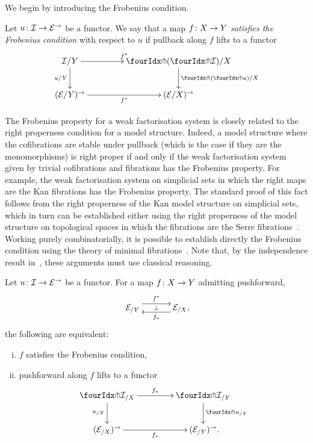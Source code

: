 \documentclass[reqno,10pt,a4paper,oneside,draft]{amsart}
\begin{document}
\medskip

We begin by introducing the Frobenius condition.

\begin{definition}
Let $u \colon \mathcal{I} \to \mathcal{E}^\to$ be a functor.
We say that a map $f \colon X \to Y$ \emph{satisfies the Frobenius condition} with respect to $u$ if pullback along $f$ lifts to a functor
\[
\xymatrix@C=1.5cm{
  \cal{I}/Y
  \ar[r]^{f^*}
  \ar[d]_{u/Y}
&
  \liftl{ ( \liftr{\cal{I}} )}/X  
  \ar[d]^{\liftl{(\liftr{u})/X}}
\\
  (\catE/Y)^\to \ar[r]_{f^*}
&
  (\catE/X)^\to
}
\]
\end{definition}


The Frobenius property for a weak factorisation system is closely related to the right properness condition for a model structure.
Indeed, a model structure where the cofibrations are stable under pullback (which is the case if they are the monomorphisms) is right proper if and only if the weak factorisation system given by trivial cofibrations and fibrations has the Frobenius property.
For example, the weak factorisation system on simplicial sets in which the right maps are the Kan fibrations has the Frobenius property.
The standard proof of this fact follows from the right properness of the Kan model structure on simplicial sets, which in turn can be established either using the right properness of the model structure on topological spaces in which  the fibrations are the Serre fibrations~\cite[Theorem~13.1.13]{hirschhorn-model-localizations}. Working purely combinatorially, it is possible to
establish directly the Frobenius condition using the theory of minimal fibrations~\cite[Theorem~1.7.1]{joyal-tierney-notes}.
Note that, by the independence result in~\cite{coquand-non-constructivity-kan}, these arguments must use classical reasoning. 


\begin{proposition} \label{lift-dependent-product}
Let $u \colon \mathcal{I} \to \mathcal{E}^\to$ be a functor.
For a map $f \colon X \to Y$ admitting pushforward, 
\[
\xymatrix@C+1em{
  \catE_{/Y}
  \ar@<5pt>[r]^{f^*}
  \ar@{}[r]|{\bot}
&
  \catE_{/X}
  \ar@<5pt>[l]^{f_*} \rlap{,}
}
\]
the following are equivalent:
\begin{enumerate}[(i)]
\item $f$ satisfies the Frobenius condition,
\item pushforward along $f$ lifts to a functor
\[
\xymatrix@C=1.5cm{
  \liftr{\cal{I}}_{/X}
  \ar[r]^{f_*}
  \ar[d]_{u_{/X}}
&
  \liftr{\cal{I}}_{/Y}
  \ar[d]^{\liftr{u}_{/Y}}
\\
  (\catE_{/X})^\to
  \ar[r]_{f_*}
&
  (\catE_{/Y})^\to \rlap{.}
}
\]

\end{enumerate}
\end{proposition}
\end{document}
